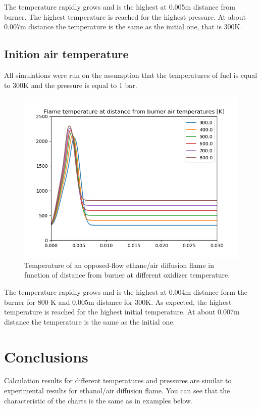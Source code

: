 \documentclass[a4paper]{article}
\newcommand{\sepspace}{\vspace*{1em}}
\begin{document}
\sepspace
The temperature rapidly grows and is the highest at 0.005m distance from burner. The highest temperature is reached for the highest pressure. At about 0.007m distance the temperature is the same as the initial one, that is 300K.

\pagebreak

\subsection{Inition air temperature}
All simulations were run on the assumption that the temperatures of fuel is equal to 300K and the pressure is equal to 1 bar. 



\begin{figure}[h]
\centering
\includegraphics[width=1\textwidth]{c2h6_diffusion_temperature.png}
\caption{\label{fig:2}Temperature of an opposed-flow ethane/air diffusion flame in function of distance from burner at different oxidizer temperature.}
\end{figure}

\sepspace
The temperature rapidly grows and is the highest at 0.004m  distance form the burner for 800 K and 0.005m distance for 300K. As expected, the highest temperature is reached for the highest initial  temperature. At about 0.007m distance the temperature is the same as the initial one.

\pagebreak


\section{Conclusions}
Calculation results for different temperatures and pressures are similar to experimental results for ethanol/air diffusion flame. You can see that the characteristic of the charts is the same as in examples below. 
 
\end{document}
